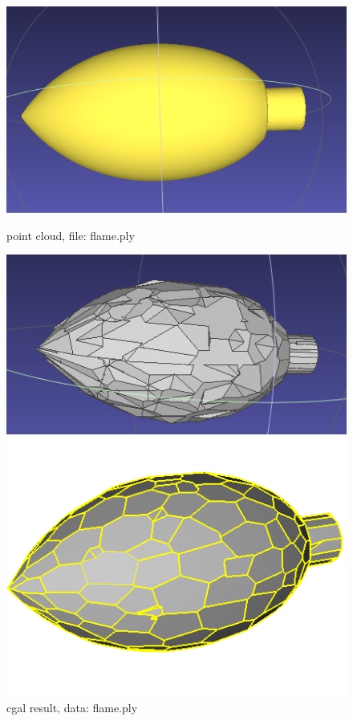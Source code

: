 \documentclass{article}
\begin{document}
  \begin{figure}[H]
    \begin{minipage}[t]{0.29\textwidth}
        \includegraphics[width=\textwidth]{../../images/screen_kinetic/flame_point.png}
        \caption*{point cloud,\newline
        file: flame.ply}
    \end{minipage}
    \begin{minipage}[t]{0.33\textwidth}
      \includegraphics[width=\textwidth]{../../images/screen_kinetic/flame_cgal.png}
      \caption*{cgal result,\newline
      data: flame.ply}
    \end{minipage}
    \begin{minipage}[t]{0.27\textwidth}
        \includegraphics[width=\textwidth]{../../images/screen_kinetic/flame_inria.png}

\end{minipage}
\end{figure}
\end{document}
